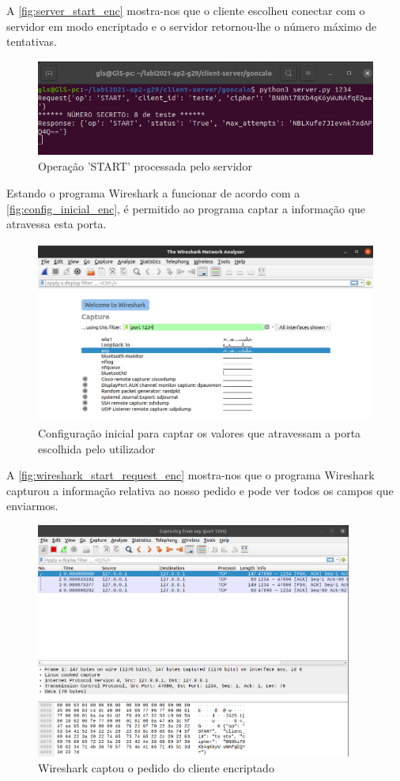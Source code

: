\documentclass{report}
\begin{document}
A \autoref{fig:server_start_enc} mostra-nos que o cliente escolheu conectar com o servidor em modo encriptado e o servidor retornou-lhe o número máximo de tentativas.

\begin{figure}[!h]
\center 
\includegraphics[height=90pt]{img/encripted/server_start.png}
\caption{Operação 'START' processada pelo servidor}
\label{fig:server_start_enc}
\end{figure}

Estando o programa Wireshark a funcionar de acordo com a \autoref{fig:config_inicial_enc}, é permitido ao programa captar a informação que atravessa esta porta. 

\begin{figure}[!h]
\center 
\includegraphics[height=170pt]{img/encripted/config_inicial.png}
\caption{Configuração inicial para captar os valores que atravessam a porta escolhida pelo utilizador}
\label{fig:config_inicial_enc}
\end{figure}

A \autoref{fig:wireshark_start_request_enc} mostra-nos que o programa Wireshark capturou a informação relativa ao nosso pedido e pode ver todos os campos que enviarmos.

\begin{figure}[!h]
\center 
\includegraphics[height=220pt]{img/encripted/wireshark_start_request.png}
\caption{Wireshark captou o pedido do cliente encriptado}
\label{fig:wireshark_start_request_enc}
\end{figure}
\end{document}
